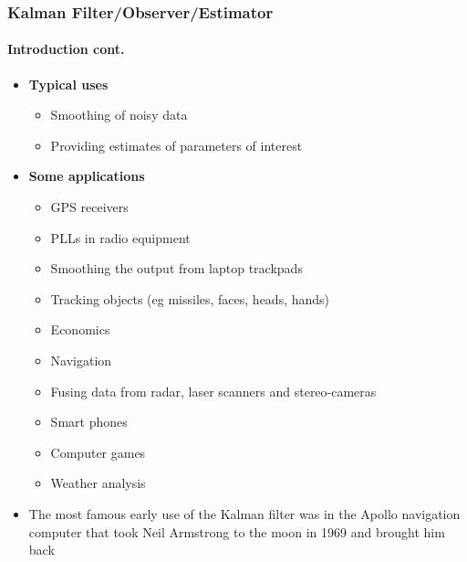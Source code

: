 \begin{frame}\pw\Large
\frametitle{Kalman Filter/Observer/Estimator}
\framesubtitle{Introduction \tiny cont.}

\begin{itemize}\scriptsize
\item \textbf{Typical uses}
\begin{itemize}\scriptsize
\item Smoothing of noisy data 
\item Providing estimates of parameters of interest
\end{itemize}
\item \textbf{Some applications}
\begin{itemize}\scriptsize
\item GPS receivers
\item PLLs in radio equipment
\item Smoothing the output from laptop trackpads
\item Tracking objects (eg missiles, faces, heads, hands)
\item Economics
\item Navigation
\item Fusing data from radar, laser scanners and stereo-cameras
\item Smart phones
\item Computer games
\item Weather analysis
\end{itemize}
\item The most famous early use of the Kalman filter was in the Apollo navigation computer that took Neil Armstrong to the moon in 1969 and brought him back
\end{itemize}
\end{frame}



